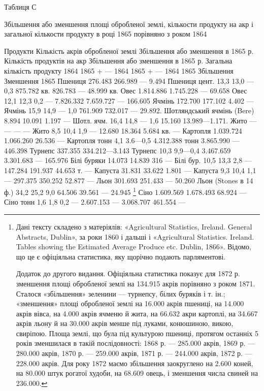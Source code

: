 Таблиця С

Збільшення або зменшення площі обробленої землі, кількости продукту на акр і загальної кількости
продукту в році 1865 порівняно з роком 1864

Продукти    Кількість акрів обробленої землі        Збільшення або зменшення в 1865 р. Кількість
продуктів на акр            Збільшення або зменшення в 1865 р. Загальна кількість продукту
    1864    1865 + — 1864        1865 + — 1864        1865    Збільшення    Зменшення 1865
Пшениця             276.483           266.989  — 9.494
Пшениця цент.    13,3    13,0 — 0,3    875.782    кв.    826.783    —   48.999 кв.
Овес                              1.814.886       1.745.228   —   69.658
Овес    12,1    12,3    0,2  —   7.826.332   7.659.727   —   166.605
Ячмінь                           172.700           177.102             4.402 —
Ячмінь     15,9    14,9    —   1,0    761.909        732.017  —  29.892.
Шотляндський ячмінь (Bere)    8.894    10.091    1.197   —
Шотл. ячм. 16,4    14,8  —  1,6    15.160        13.989—1.171.
Жито    —    —    —     —
Жито 8,5    10,4    1,9   —   12.680 18.364    5.684 кв. —
Картопля       1.039.724      1.066.260            26.536 —
Картопля тонн    4,1    3.6—0,5    4.312.388   тонн    3.865.990    —    446.398
Турнепс                      337.355    334.212—3.143
Турнепс 10,3    9,9—0,4    3.467.659        3.301.683     —     165.976
Білі буряки 14.073    14.839    316        —
Білі бур. 10,5    13,3    2,8     —     147.284     191.937    44.653 т.     —
Капуста        31.831    33.622    1.801 —
Капуста    9,3    10,4    1,1    —     297.375        350.252    52.877 —
Льон        301.693    251.433       —      50.260
Льон (Stones в 14 ф.) 34,2        25,2            9,0    64.506        39.561    —  24.945 \footnote{
Дані тексту складено з матеріялів: «Agricultural Statistics, Ireland. General Abstracts,
Dublin», за роки 1860 і дальші і «Agricultural Statistics. Ireland. Tables showing the Estimated
Average Produce etc. Dublin, 1866».
Відомо, що це є офіціяльна статистика, яку щорічно подають парляментові.

Додаток до другого видання. Офіціяльна статистика показує для 1872 р. зменшення площі обробленої
землі на 134.915 акрів порівняно з роком 1871. Сталося «збільшення» зеленини — турнепсу, білих
буряків і т. ін.; «зменшення» площі обробленої землі на 16.000 акрів пшениці, на 14.000 акрів вівса,
на 4.000 акрів ячменю й жита, на 66.632 акри картоплі, на 34.667 акрів льону й на 30.000 акрів менше
під луками, конюшиною, викою, свиріпою. Площа землі, що була під культурою пшениці, протягом
останніх 5 років зменшилася в такій послідовності: 1868 р. — 285.000 акрів, 1869 р. — 280.000 акрів,
1870 р. — 259.000 акрів, 1871 р. — 244.000 акрів, 1872 р. — 228.000 акрів. Для року 1872 маємо
збільшення заокруглено на 2.600 коней, на 80.000 штук рогатої худоби, на 68.609 овець, і зменшення
числа свиней на 236.000.
}
Сіно        1.609.569    1.678.493    68.924      —
Сіно тонн    1,6    1,8    0,2   —  2.607.153   —  3.068.707    461.554   —